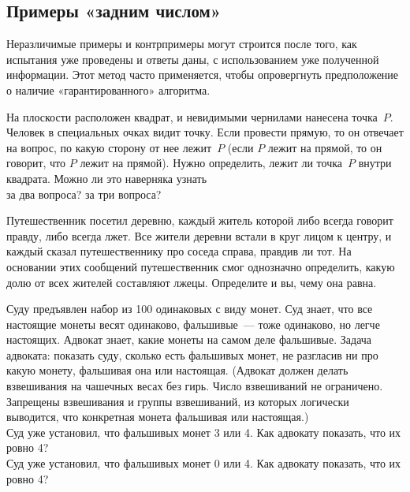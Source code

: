 \subsection*{Примеры «задним числом»}
Неразличимые примеры и контрпримеры могут строится после того, как испытания
уже проведены и ответы даны, с использованием уже полученной информации.
Этот метод часто применяется, чтобы опровергнуть предположение о наличие
«гарантированного» алгоритма.

\begin{problems}

\item
На плоскости расположен квадрат, и невидимыми чернилами нанесена точка~$P$.
Человек в специальных очках видит точку.
Если провести прямую, то он отвечает на вопрос, по какую сторону от нее
лежит~$P$ (если $P$ лежит на прямой, то он говорит, что $P$ лежит на прямой).
Нужно определить, лежит ли точка~$P$ внутри квадрата.
Можно ли это наверняка узнать
\\
\subproblem за два вопроса?
\qquad
\subproblem за три вопроса?

\item
Путешественник посетил деревню, каждый житель которой либо всегда говорит
правду, либо всегда лжет.
Все жители деревни встали в круг лицом к центру, и каждый сказал
путешественнику про соседа справа, правдив ли тот.
На основании этих сообщений путешественник смог однозначно определить, какую
долю от всех жителей составляют лжецы.
Определите и вы, чему она равна.

\item
Суду предъявлен набор из 100 одинаковых с виду монет.
Суд знает, что все настоящие монеты весят одинаково, фальшивые~— тоже
одинаково, но легче настоящих.
Адвокат знает, какие монеты на самом деле фальшивые.
Задача адвоката: показать суду, сколько есть фальшивых монет, не разгласив
ни про какую монету, фальшивая она или настоящая.
(Адвокат должен делать взвешивания на чашечных весах без гирь.
Число взвешиваний не ограничено.
Запрещены взвешивания и группы взвешиваний, из которых логически выводится, что
конкретная монета фальшивая или настоящая.)
\\
\subproblem
Суд уже установил, что фальшивых монет 3 или 4.
Как адвокату показать, что их ровно 4?
\\
\subproblem
Суд уже установил, что фальшивых монет 0 или 4.
Как адвокату показать, что их ровно 4?

\end{problems}

